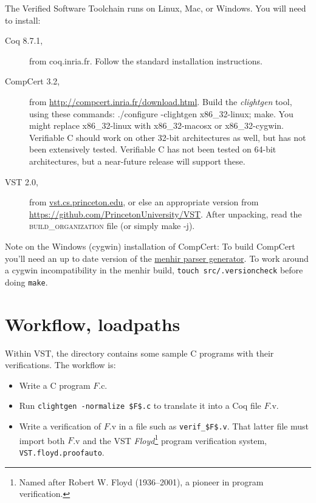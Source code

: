 \documentclass[12pt,fleqn,openany,oneside,showtrims]{memoir}
\begin{document}
The Verified Software Toolchain runs on Linux, Mac, or Windows.
You will need to install:

\begin{description}
\item[Coq 8.7.1,] from coq.inria.fr.  Follow the standard installation instructions.
\item[CompCert 3.2,] from \href{http://compcert.inria.fr/download.html}{http://compcert.inria.fr/download.html}.
  Build the \emph{clightgen} tool, using these commands:
  \textsf{./configure -clightgen x86\_32-linux; make}.  You might replace
  x86\_32-linux with x86\_32-macosx or x86\_32-cygwin.  Verifiable C should work
  on other 32-bit architectures as well, but has not been extensively tested.
  Verifiable C has not been tested on 64-bit architectures, but
  a near-future release will support these.
\item[VST 2.0,] from \href{vst.cs.princeton.edu}{vst.cs.princeton.edu},
  or else an appropriate
  version from \href{https://github.com/PrincetonUniversity/VST}{https://github.com/PrincetonUniversity/VST}.
  After unpacking, read the \textsc{build\_organization} file
  (or simply \textsf{make -j}).
\end{description}

{\small
  Note on the Windows (cygwin) installation of CompCert:
  To build CompCert you'll need an up to date version of the
  \href{http://gallium.inria.fr/~fpottier/menhir/}{menhir parser generator}.
  To work around a cygwin incompatibility in the menhir build,
  \lstinline{touch src/.versioncheck} before doing \lstinline{make}.}

\chapter{Workflow, loadpaths}
\label{refman:workflow}
Within VST, the  directory contains some sample C programs
with their verifications.  The workflow is:
\begin{itemize}
\item Write a C program $F$.c.
\item Run \lstinline{clightgen -normalize $F$.c} to translate it into a Coq
file $F$.v.
\item Write a verification of $F$.v in a file such as
\lstinline{verif_$F$.v}.  That latter file must import
both $F$.v and the VST \emph{Floyd}\footnote{Named after Robert W. Floyd (1936--2001), a pioneer in program verification.} program verification system,
\lstinline{VST.floyd.proofauto}.
\end{itemize}
\end{document}
